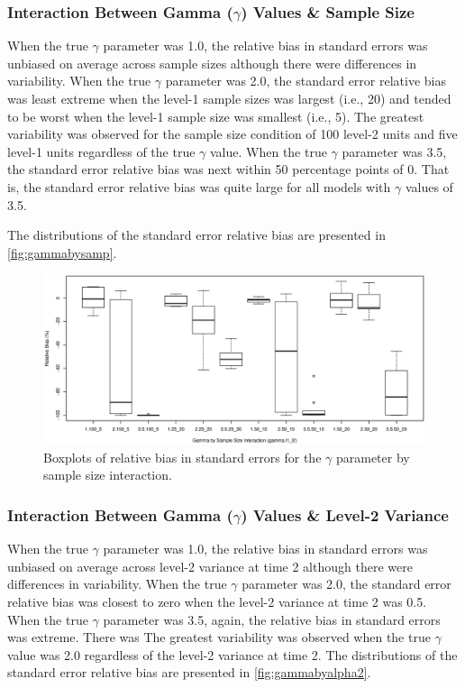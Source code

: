 \documentclass[man]{apa6}
\begin{document}
\subsubsection*{Interaction Between Gamma ($\gamma$) Values \& Sample Size}
When the true $\gamma$ parameter was 1.0, the relative bias in standard errors was unbiased on average across sample sizes although there were differences in variability. When the true $\gamma$ parameter was 2.0, the standard error relative bias was least extreme when the level-1 sample sizes was largest (i.e., 20) and tended to be worst when the level-1 sample size was smallest (i.e., 5). The greatest variability was observed for the sample size condition of 100 level-2 units and five level-1 units regardless of the true $\gamma$ value. When the true $\gamma$ parameter was 3.5, the standard error relative bias was next within 50 percentage points of 0. That is, the standard error relative bias was quite large for all models with $\gamma$ values of 3.5.

The distributions of the standard error relative bias are presented in \autoref{fig:gammabysamp}.

\begin{figure}[ht]
\centering
\includegraphics[scale=.5]{gammabysamp.eps}
\caption{Boxplots of relative bias in standard errors for the $\gamma$ parameter by sample size interaction.}\label{fig:gammabysamp}
\end{figure}

\subsubsection*{Interaction Between Gamma ($\gamma$) Values \& Level-2 Variance}
When the true $\gamma$ parameter was 1.0, the relative bias in standard errors was unbiased on average across level-2 variance at time 2 although there were differences in variability. When the true $\gamma$ parameter was 2.0, the standard error relative bias was closest to zero when the level-2 variance at time 2 was 0.5. When the true $\gamma$ parameter was 3.5, again, the relative bias in standard errors was extreme. There was The greatest variability was observed when the true $\gamma$ value was 2.0 regardless of the level-2 variance at time 2. The distributions of the standard error relative bias are presented in \autoref{fig:gammabyalpha2}.
\end{document}

